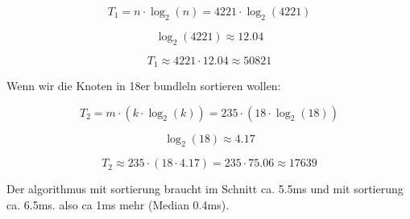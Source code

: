 \[
T_1 = n \cdot \log_2(n) = 4221 \cdot \log_2(4221)
\]

\[
\log_2(4221) \approx 12.04
\]

\[
T_1 \approx 4221 \cdot 12.04 \approx 50821
\]

Wenn wir die Knoten in 18er bundleln sortieren wollen: 

\[
T_2 = m \cdot \left(k \cdot \log_2(k)\right) = 235 \cdot \left(18 \cdot \log_2(18)\right)
\]

\[
\log_2(18) \approx 4.17
\]

\[
T_2 \approx 235 \cdot (18 \cdot 4.17) = 235 \cdot 75.06 \approx 17639
\]


Der algorithmus mit sortierung braucht im Schnitt ca. 5.5ms und mit sortierung ca. 6.5ms. also ca 1ms mehr (Median 0.4ms). 


